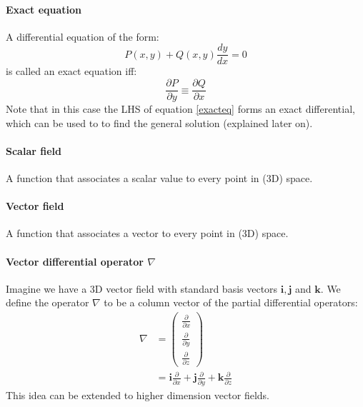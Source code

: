 \documentclass{scrartcl}
\renewcommand{\vec}[1]{\mathbf{#1}}
\begin{document}
\paragraph{Exact equation}
A differential equation of the form:
\begin{equation} \label{exacteq}
P(x, y) + Q(x, y) \frac{dy}{dx} = 0
\end{equation}
is called an exact equation iff:
\begin{equation}
\frac{\partial P}{\partial y} \equiv \frac{\partial Q}{\partial x}
\end{equation}
Note that in this case the LHS of equation \ref{exacteq} forms an exact differential, which can be used to to find the general solution (explained later on).

\paragraph{Scalar field}
A function that associates a scalar value to every point in (3D) space.

\paragraph{Vector field}
A function that associates a vector to every point in (3D) space.

\paragraph{Vector differential operator $ \nabla $}
Imagine we have a 3D vector field with standard basis vectors $ \vec{i}, \vec{j} $ and $ \vec{k}  $. We define the operator $ \nabla $ to be a column vector of the partial differential operators:
\begin{align}
\nabla & = 
\begin{pmatrix}
\frac{\partial}{\partial x} \\[6pt]
\frac{\partial}{\partial y} \\[6pt]
\frac{\partial}{\partial z}
\end{pmatrix} \\[6pt]
& = \vec{i} \frac{\partial}{\partial x} + \vec{j} \frac{\partial}{\partial y} + \vec{k} \frac{\partial}{\partial z}
\end{align}
This idea can be extended to higher dimension vector fields.
\end{document}

